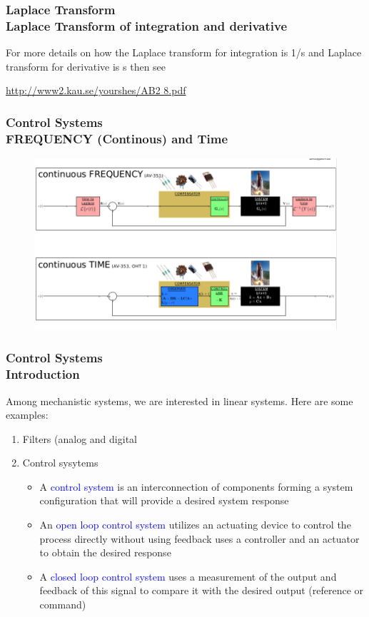 \documentclass[hyperref={pdfpagelabels=true}]{beamer}
\begin{document}
\begin{frame}
\frametitle{Laplace Transform \\ {\small Laplace Transform of integration and derivative}}
For more details on how the Laplace transform for
integration is 1/s and Laplace transform for derivative
is s then see 
\begin{beamerboxesrounded}[shadow=true]{}
\url{http://www2.kau.se/yourshes/AB2 8.pdf}
\end{beamerboxesrounded}
\end{frame}

\begin{frame}
\frametitle{Control Systems \\ {\small FREQUENCY (Continous) and Time}} 
\begin{figure}[!tbp]
\centering
\includegraphics[scale = 0.35]{figs/Selection_019.png}
\end{figure}
\end{frame}

\begin{frame}
\frametitle{Control Systems \\ {\large Introduction}} 
Among mechanistic systems, we are interested in linear
systems. Here are some examples:
\begin{enumerate}
  \item Filters (analog and digital
  \item Control sysytems
\begin{itemize}
\item A \textcolor{blue}{control system} is an interconnection of
components forming a system configuration that
will provide a desired system response
\item An \textcolor{blue}{open loop control system} utilizes an actuating
device to control the process directly without using
feedback uses a controller and an actuator to
obtain the desired response
\item A \textcolor{blue}{closed loop control system} uses a measurement
of the output and feedback of this signal to
compare it with the desired output (reference or
command)
\end{itemize}
\end{enumerate}
\end{frame}
\end{document}
